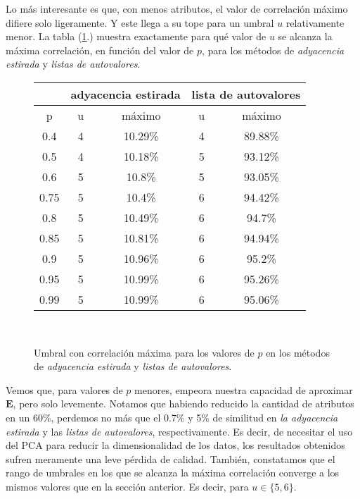 \vspace{1em}
Lo más interesante es que, con menos atributos, el valor de correlación máximo difiere solo ligeramente.
Y este llega a su tope para un umbral $u$ relativamente menor.
La tabla (\ref{tabla_correlaciones_pca}.) muestra exactamente para qué valor de $u$ se alcanza la máxima correlación, en función del valor de $p$, para los métodos de \textit{adyacencia estirada} y \textit{listas de autovalores}.

\vspace{1em}
\begin{figure}[!htbp]
    \begin{tabular}{ c|c|c|c|c } 
    \hline
     & \multicolumn{2}{c}{adyacencia estirada} & \multicolumn{2}{c}{lista de autovalores} \\
    \hline
    p & u & máximo & u & máximo \\
    \hline
    0.4            &4       &10.29\%                 & 4    &89.88\%  \\
    0.5            &4       &10.18\%             & 5    &93.12\%  \\
    0.6            &5       &10.8\%                & 5     &93.05\%      \\
    0.75            &5      &10.4\%              & 6    &94.42\%     \\
    0.8            &5       &10.49\%             & 6    &94.7\%      \\
    0.85            &5      &10.81\%              & 6       &94.94\% \\
    0.9            &5       &10.96\%             & 6    &95.2\%  \\
    0.95            &5      &10.99\%              & 6      &95.26\% \\
    0.99            &5      &10.99\%               & 6      &95.06\% \\
    \hline
    \end{tabular} \\
    \bigskip
    \caption{Umbral con correlación máxima para los valores de $p$ en los métodos de \textit{adyacencia estirada} y \textit{listas de autovalores}.} \label{tabla_correlaciones_pca}
\end{figure}

Vemos que, para valores de $p$ menores, empeora nuestra capacidad de aproximar $\textbf{E}$, pero solo levemente.
Notamos que habiendo reducido la cantidad de atributos en un 60\%, perdemos no más que el 0.7\% y 5\% de similitud en \textit{la adyacencia estirada} y las \textit{listas de autovalores}, respectivamente.
Es decir, de necesitar el uso del PCA para reducir la dimensionalidad de los datos, los resultados obtenidos sufren meramente una leve pérdida de calidad.
También, constatamos que el rango de umbrales en los que se alcanza la máxima correlación converge a los mismos valores que en la sección anterior.
Es decir, para $u \in \{5, 6\}$.
